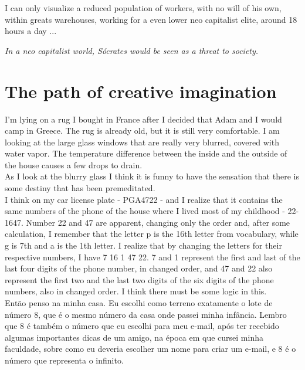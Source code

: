 \documentclass[11pt]{book}
\begin{document}
\noindent I can only visualize a reduced population of workers, with no will of his own, within greats warehouses, working for a even lower neo capitalist elite, around 18 hours a day ...

\noindent \begin{center} \emph{In a neo capitalist world, Sócrates would be seen as a threat to society.} \end{center}

\chapter{The path of creative imagination}

\noindent I'm lying on a rug I bought in France after I decided that Adam and I would camp in Greece. The rug is already old, but it is still very comfortable. I am looking at the large glass windows that are really very blurred, covered with water vapor. The temperature difference between the inside and the outside of the house causes a few drops to drain. \\

\noindent As I look at the blurry glass I think it is funny to have the sensation that there is some destiny that has been premeditated. \\

\noindent I think on my car license plate - PGA4722 - and I realize that it contains the same numbers of the phone of the house where I lived most of my childhood - 22-1647. Number 22 and 47 are apparent, changing only the order and, after some calculation, I remember that the letter p is the 16th letter from vocabulary, while g is 7th and a is the 1th letter. I realize that by changing the letters for their respective numbers, I have 7 16 1 47 22. 7 and 1 represent the first and last of the last four digits of the phone number, in changed order, and 47 and 22 also represent the first two and the last two digits of the six digits of the phone numbers, also in changed order. I think there must be some logic in this. \\

\noindent Então penso na minha casa. Eu escolhi como terreno exatamente o lote de número 8, que é o mesmo número da casa onde passei minha infância. Lembro que 8 é também o número que eu escolhi para meu e-mail, após ter recebido algumas importantes dicas de um amigo, na época em que cursei minha faculdade, sobre como eu deveria escolher um nome para criar um e-mail, e 8 é o número que representa o infinito. \\
\end{document}
